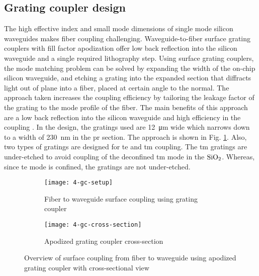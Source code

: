\documentclass[../report.tex]{subfiles}
\begin{document}
\subsection{Grating coupler design}
The high effective index and small mode dimensions of single mode silicon waveguides makes fiber coupling challenging. Waveguide-to-fiber surface grating couplers with fill factor apodization offer low back reflection into the silicon waveguide and a single required lithography step. Using surface grating couplers, the mode matching problem can be solved by expanding the width of the on-chip silicon waveguide, and etching a grating into the expanded section that diffracts light out of plane into a fiber, placed at certain angle to the normal. The approach taken increases the coupling efficiency by tailoring the leakage factor of the grating to the mode profile of the fiber. The main benefits of this approach are a low back reflection into the silicon waveguide and high efficiency in the coupling \cite{grating_coupler}. In the design, the gratings used are \SI{12}{\micro\meter} wide which narrows down to a width of \SI{230}{\nano\meter} in the \gls{pr} section. The approach is shown in Fig. \ref{fig:4_gc_setup}. Also, two types of gratings are designed for \gls{te} and \gls{tm} coupling. The \gls{tm} gratings are under-etched to avoid coupling of the deconfined \gls{tm} mode in the $\mathrm{SiO_{2}}$. Whereas, since \gls{te} mode is confined, the gratings are not under-etched. 

\begin{figure}[H] %
	\begin{subfigure}[t]{0.45\textwidth}
		\texttt{[image: 4-gc-setup]}
		\caption{Fiber to waveguide surface coupling using grating coupler}
		\label{fig:4_gc_setup}
	\end{subfigure}
	\hfill
	\begin{subfigure}[t]{0.45\textwidth}
		\texttt{[image: 4-gc-cross-section]}
		\caption{Apodized grating coupler cross-section}
		\label{fig:4_gc_cross_section}
	\end{subfigure}
	\caption{Overview of surface coupling from fiber to waveguide using apodized grating coupler with cross-sectional view}
\end{figure}
\end{document}
